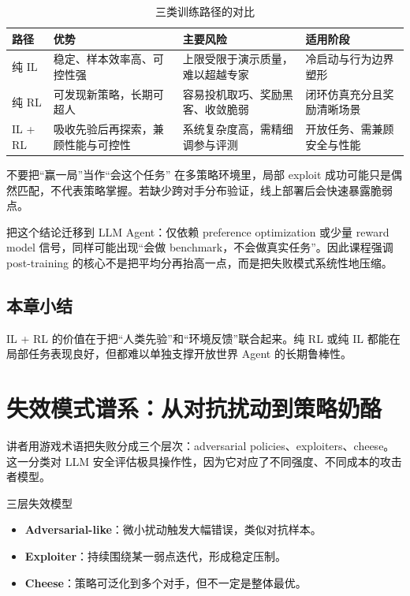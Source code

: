 \documentclass[a4paper]{article}
\begin{document}
\begin{table}[H]
\centering
\caption{三类训练路径的对比}
\begin{tabular}{p{2.2cm}p{4.0cm}p{4.0cm}p{3.4cm}}
\toprule
路径 & 优势 & 主要风险 & 适用阶段 \\
\midrule
纯 IL & 稳定、样本效率高、可控性强 & 上限受限于演示质量，难以超越专家 & 冷启动与行为边界塑形 \\
纯 RL & 可发现新策略，长期可超人 & 容易投机取巧、奖励黑客、收敛脆弱 & 闭环仿真充分且奖励清晰场景 \\
IL + RL & 吸收先验后再探索，兼顾性能与可控性 & 系统复杂度高，需精细调参与评测 & 开放任务、需兼顾安全与性能 \\
\bottomrule
\end{tabular}
\end{table}

\begin{warningbox}{不要把``赢一局''当作``会这个任务''}
在多策略环境里，局部 exploit 成功可能只是偶然匹配，不代表策略掌握。若缺少跨对手分布验证，线上部署后会快速暴露脆弱点。
\end{warningbox}

把这个结论迁移到 LLM Agent：仅依赖 preference optimization 或少量 reward model 信号，同样可能出现``会做 benchmark，不会做真实任务''。因此课程强调 post-training 的核心不是把平均分再抬高一点，而是把失败模式系统性地压缩。

\subsection{本章小结}
IL + RL 的价值在于把``人类先验''和``环境反馈''联合起来。纯 RL 或纯 IL 都能在局部任务表现良好，但都难以单独支撑开放世界 Agent 的长期鲁棒性。

\section{失效模式谱系：从对抗扰动到策略奶酪}

讲者用游戏术语把失败分成三个层次：adversarial policies、exploiters、cheese。这一分类对 LLM 安全评估极具操作性，因为它对应了不同强度、不同成本的攻击者模型。

\begin{knowledgebox}{三层失效模型}
\begin{itemize}
    \item \textbf{Adversarial-like}：微小扰动触发大幅错误，类似对抗样本。
    \item \textbf{Exploiter}：持续围绕某一弱点迭代，形成稳定压制。
    \item \textbf{Cheese}：策略可泛化到多个对手，但不一定是整体最优。
\end{itemize}
\end{knowledgebox}
\end{document}
